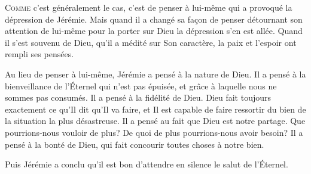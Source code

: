 \dvrule







\lettrine{C}{omme} c'est généralement le cas, c'est de penser à lui-même
 qui a provoqué la dépression de Jérémie.
 Mais quand il a changé sa fa\c{c}on de penser
 \ocadr détournant son attention de lui-même pour la porter sur Dieu \fcadr{}
 la dépression s'en est allée. Quand il s'est souvenu de Dieu,
 qu'il a médité sur Son caractère, la paix et l'espoir ont rempli ses pensées. 


Au lieu de penser à lui-même, Jérémie a pensé à la nature de Dieu.
 Il a pensé à la bienveillance de l'Éternel qui n'est pas épuisée,
 et grâce à laquelle nous ne sommes pas consumés.
 Il a pensé à la fidélité de Dieu. Dieu fait toujours exactement
 ce qu'Il dit qu'Il va faire, et Il est capable de faire ressortir du bien
 de la situation la plus désastreuse. Il a pensé au fait que Dieu
 est notre partage. Que pourrions-nous vouloir de plus?
 De quoi de plus pourrions-nous avoir besoin?
 Il a pensé à la bonté de Dieu,
 qui fait concourir toutes choses à notre bien. 

Puis Jérémie a conclu qu'il est bon \Og d'attendre en silence
 le salut de l'Éternel. \Fg{}

